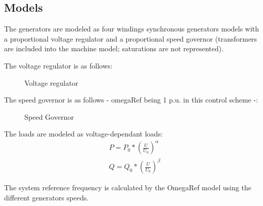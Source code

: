 \documentclass[a4paper, 12pt]{report}
\begin{document}
\subsection{Models}

The generators are modeled as four windings synchronous generators models with a proportional voltage regulator and a proportional speed governor (transformers are included into the machine model; saturations are not represented).

The voltage regulator is as follows:
\begin{figure}[H]
\centering
{}
\caption{Voltage regulator}
\end{figure}

The speed governor is as follows - omegaRef being 1 p.u. in this control scheme -:
\begin{figure}[H]
\centering
{}
\caption{Speed Governor}
\end{figure}

The loads are modeled as voltage-dependant loads:
\begin{equation*}
\begin{aligned}
& P = P_{0} * (\frac{U}{U_{0}})^\alpha \\
& Q = Q_{0} * (\frac{U}{U_{0}})^\beta
\end{aligned}
\label{Voltage-dependant load model}
\end{equation*}

The system reference frequency is calculated by the OmegaRef model using the different generators speeds.\\
\end{document}
